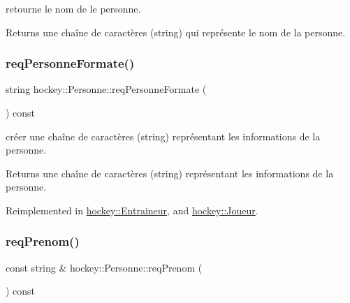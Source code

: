 retourne le nom de le personne. 

\begin{DoxyReturn}{Returns}
une chaîne de caractères (string) qui représente le nom de la personne. 
\end{DoxyReturn}
\mbox{\label{classhockey_1_1Personne_ae67b3d253c1fa8a090dd8040ca1e8ccc}} 
\subsubsection{\texorpdfstring{req\+Personne\+Formate()}{reqPersonneFormate()}}
{\footnotesize\ttfamily string hockey\+::\+Personne\+::req\+Personne\+Formate (\begin{DoxyParamCaption}{ }\end{DoxyParamCaption}) const\hspace{0.3cm}{\ttfamily [virtual]}}



créer une chaîne de caractères (string) représentant les informations de la personne. 

\begin{DoxyReturn}{Returns}
une chaîne de caractères (string) représentant les informations de la personne. 
\end{DoxyReturn}


Reimplemented in \hyperlink{classhockey_1_1Entraineur_a376149c10b8541c45d703682d41d80f3}{hockey\+::\+Entraineur}, and \hyperlink{classhockey_1_1Joueur_ab3d6b15e55aa765807e4960108f7db29}{hockey\+::\+Joueur}.

\mbox{\label{classhockey_1_1Personne_ae4257bc9fcd9f97d2a982797642401ee}} 
\subsubsection{\texorpdfstring{req\+Prenom()}{reqPrenom()}}
{\footnotesize\ttfamily const string \& hockey\+::\+Personne\+::req\+Prenom (\begin{DoxyParamCaption}{ }\end{DoxyParamCaption}) const}



